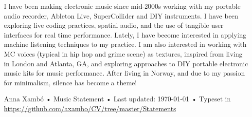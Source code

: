 \documentclass[10pt, a4paper]{article}
\begin{document}
I have been making electronic music since mid-2000s working with my portable audio recorder, Ableton Live, SuperCollider and DIY instruments. I have been exploring live coding practices, spatial audio, and the use of tangible user interfaces for real time performance. Lately, I have become interested in applying machine listening techniques to my practice. I am also interested in working with MC voices (typical in hip hop and grime scene) as textures, inspired from living in London and Atlanta, GA, and exploring approaches to DIY portable electronic music kits for music performance. After living in Norway, and due to my passion for minimalism, silence has become a theme!

\vfill{}

\begin{center}
{\scriptsize  Anna Xambó •\- Music Statement •\- Last updated: \today\- •\- %
Typeset in \href{http://nitens.org/taraborelli/cvtex}{
\XeTeX }\\
\href{https://github.com/axambo/CV/tree/master/Statements}{https://github.com/axambo/CV/tree/master/Statements}}
\end{center}
\end{document}
